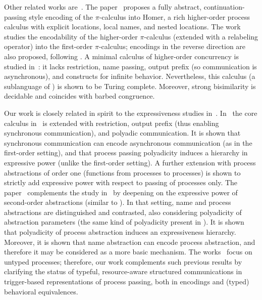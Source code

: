 Other related works are~\cite{BundgaardHG06,XuActa2012,DBLP:journals/iandc/LanesePSS11}.
The paper~\cite{BundgaardHG06} proposes a fully abstract, continuation-passing style encoding of the 
$\pi$-calculus into Homer, a rich higher-order process calculus with explicit locations, local names, and nested locations.
The work~\cite{XuActa2012} studies the encodability of the higher-order $\pi$-calculus (extended with a relabeling operator) into the first-order $\pi$-calculus; encodings in the reverse direction are also proposed, following \cite{Tho90}.
A minimal calculus of higher-order concurrency is studied in~\cite{DBLP:journals/iandc/LanesePSS11}: it lacks restriction,  name passing, output prefix (so  communication is asynchronous), and constructs for infinite behavior. 
Nevertheless, this calculus (a sublanguage of \HO) is shown to be Turing complete. Moreover, 
strong bisimilarity is decidable and coincides with barbed congruence. 


Our work is closely related in spirit to the expressiveness studies in~\cite{DBLP:conf/icalp/LanesePSS10,DBLP:conf/wsfm/XuYL13}.
In~\cite{DBLP:conf/icalp/LanesePSS10}
the core calculus in~\cite{DBLP:journals/iandc/LanesePSS11} is extended with restriction, output prefix (thus enabling synchronous communication), 
and polyadic communication. It is shown that 
synchronous communication can encode asynchronous communication (as in the first-order setting),
and that process passing polyadicity induces a hierarchy in expressive power (unlike the first-order setting).
A further extension with process abstractions of order one
(functions from processes to processes)
 is shown to strictly add expressive power with respect to passing of processes only.
The paper~\cite{DBLP:conf/wsfm/XuYL13} complements the study in~\cite{DBLP:conf/icalp/LanesePSS10} by deepening on the expressive power of second-order abstractions (similar to \HO). 
In that setting, name and process abstractions are distinguished and contrasted, also considering polyadicity of abstraction parameters (the same kind of polyadicity present in \pHOp). It is shown that polyadicity of process abstraction induces an expressiveness hierarchy. Moreover, it is shown that name abstraction can encode process abstraction, and therefore it may be considered as a more basic mechanism. 
The works~\cite{DBLP:conf/icalp/LanesePSS10,DBLP:conf/wsfm/XuYL13} focus on untyped processes;
therefore, our work complements such previous results by clarifying the status of typeful, resource-aware structured communications in
trigger-based representations of process passing, both in encodings and (typed) behavioral equivalences.

